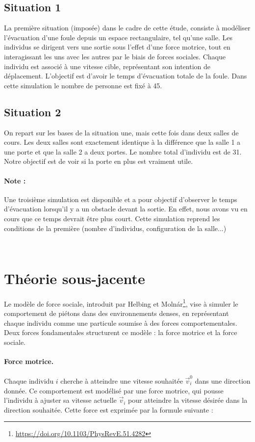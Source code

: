 \documentclass[a4paper,12pt]{article}
\begin{document}
\subsection{Situation 1}
\indent La première situation (imposée) dans le cadre de cette étude, consiste à modéliser l’évacuation d’une foule depuis un espace rectangulaire, tel qu’une salle. Les individus se dirigent vers une sortie sous l'effet d'une force motrice, tout en interagissant les uns avec les autres par le biais de forces sociales. Chaque individu est associé à une vitesse cible, représentant son intention de déplacement. L'objectif est d'avoir le temps d'évacuation totale de la foule. Dans cette simulation le nombre de personne est fixé à 45.

\subsection{Situation 2}
\indent On repart sur les bases de la situation une, mais cette fois dans deux salles de cours. Les deux salles sont exactement identique à la différence que la salle 1 a une porte et que la salle 2 a deux portes. Le nombre total d'individu est de 31. Notre objectif est de voir si la porte en plus est vraiment utile.

\paragraph{Note :}
Une troisième simulation est disponible et a pour objectif d'observer le temps d'évacuation lorsqu'il y a un obstacle devant la sortie. En effet, nous avons vu en cours que ce temps devrait être plus court. Cette simulation reprend les conditions de la première (nombre d'individus, configuration de la salle...) 

\
\section{Théorie sous-jacente}

Le modèle de force sociale, introduit par Helbing et Molnár\footnote{\url{https://doi.org/10.1103/PhysRevE.51.4282}}, vise à simuler le comportement de piétons dans des environnements denses, en représentant chaque individu comme une particule soumise à des forces comportementales. Deux forces fondamentales structurent ce modèle : la force motrice et la force sociale.

\paragraph{Force motrice.}
Chaque individu $i$ cherche à atteindre une vitesse souhaitée $\vec{v}_i^0$ dans une direction donnée. Ce comportement est modélisé par une force motrice, qui pousse l'individu à ajuster sa vitesse actuelle $\vec{v}_i$ pour atteindre la vitesse désirée dans la direction souhaitée. Cette force est exprimée par la formule suivante :
\end{document}
